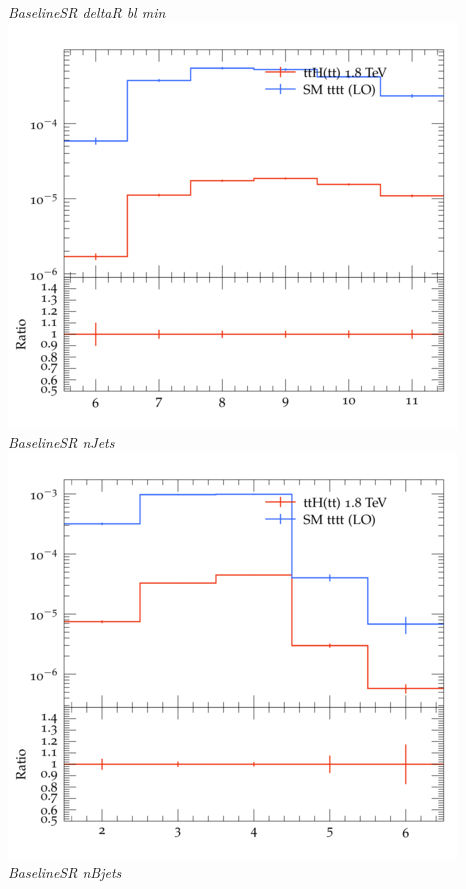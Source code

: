 \documentclass{beamer}
\begin{document}
\begin{frame}
\begin{columns}
\textit{\small BaselineSR deltaR bl min}
\includegraphics[width=\textwidth]{../plots/ttH_1800/tttt_ttH_1LOS/BaselineSR_nJets.png}\\
\textit{\small BaselineSR nJets}
\includegraphics[width=\textwidth]{../plots/ttH_1800/tttt_ttH_1LOS/BaselineSR_nBjets.png}\\
\textit{\small BaselineSR nBjets}
\end{columns}
\end{frame}
\end{document}
